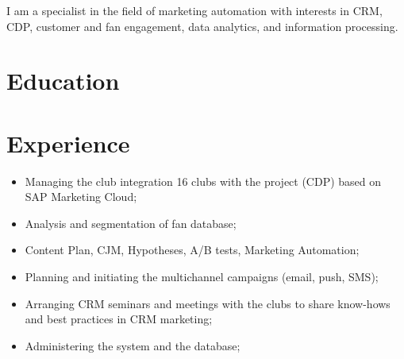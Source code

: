 \documentclass[11pt,a4paper,sans]{moderncv}
\begin{document}
 

\makecvtitle

I am a specialist in the field of marketing automation with interests in CRM, CDP, customer and fan engagement, data analytics, and information processing.

\section{Education}


\section{Experience}


\begin{itemize}
\item Managing the club integration 16 clubs with the project (CDP) based on SAP Marketing
Cloud;
\item Analysis and segmentation of fan database;
\item Content Plan, CJM, Hypotheses, A/B tests, Marketing Automation;
\item Planning and initiating the multichannel campaigns (email, push, SMS);
\item Arranging CRM seminars and meetings with the clubs to share know-hows and best practices in CRM marketing;
\item Administering the system and the database;\newline{}
\end{itemize}

\end{document}
